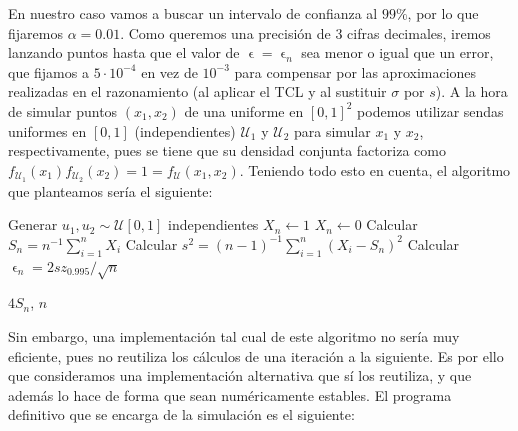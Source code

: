 \documentclass[11pt,a4paper]{article}
\let\epsilon\upvarepsilon
\begin{document}
En nuestro caso vamos a buscar un intervalo de confianza al $99\%$, por lo que fijaremos $\alpha = 0.01$. Como queremos una precisión de 3 cifras decimales, iremos lanzando puntos hasta que el valor de $\epsilon = \epsilon_n$ sea menor o igual que un error, que fijamos a $5\cdot 10^{-4}$ en vez de $10^{-3}$ para compensar por las aproximaciones realizadas en el razonamiento (al aplicar el TCL y al sustituir $\sigma$ por $s$). A la hora de simular puntos $(x_1, x_2)$ de una uniforme en $[0,1]^2$ podemos utilizar sendas uniformes en $[0,1]$ (independientes) $\mathcal U_1$ y $\mathcal U_2$ para simular $x_1$ y $x_2$, respectivamente, pues se tiene que su densidad conjunta factoriza como $f_{\mathcal U_1}(x_1)f_{\mathcal U_2}(x_2) = 1 = f_{\mathcal U}(x_1, x_2)$. Teniendo todo esto en cuenta, el algoritmo que planteamos sería el siguiente:
\vspace{.5em}

\begin{algorithmic}
  \State Generar $u_1, u_2 \sim \mathcal U[0, 1]$ independientes
    \State $X_n \gets 1$
\Else
  \State $X_n \gets 0$
\EndIf
\State Calcular $S_n = n^{-1}\sum_{i=1}^n X_i$
\State Calcular $s^2 = (n-1)^{-1}\sum_{i=1}^n (X_i - S_n)^2$
\State Calcular $\epsilon_n = 2sz_{0.995}/\sqrt{n}$
\If {$\epsilon_n < 5\cdot 10^{-4}$}

  \State \Return $4S_n$, $n$
\end{algorithmic}

\vspace{.5em}
Sin embargo, una implementación tal cual de este algoritmo no sería muy eficiente, pues no reutiliza los cálculos de una iteración a la siguiente. Es por ello que consideramos una implementación alternativa que sí los reutiliza, y que además lo hace de forma que sean numéricamente estables. El programa definitivo que se encarga de la simulación es el siguiente:
\end{document}
